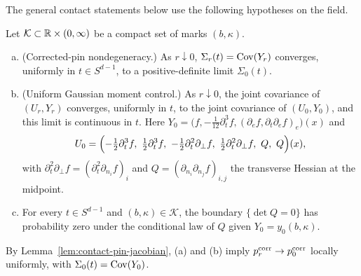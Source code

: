 The general contact statements below use the following hypotheses on the field.

\begin{hypothesis}\label{hyp:contact-regular}
Let $\mathcal K\subset\mathbb R\times(0,\infty)$ be a compact set of marks $(b,\kappa)$.
\begin{enumerate}[(a)]
\item (Corrected-pin nondegeneracy.) As $r\downarrow0$, $\Sigma_r(t)=\operatorname{Cov}(Y_r)$ converges, uniformly in $t\in S^{d-1}$, to a positive-definite limit $\Sigma_0(t)$.
\item (Uniform Gaussian moment control.) As $r\downarrow0$, the joint covariance of $(U_r,Y_r)$ converges, uniformly in $t$, to the joint covariance of $(U_0,Y_0)$, and this limit is continuous in $t$. Here $Y_0=\bigl(f,-\frac1{12}\partial_t^3f,(\partial_ef,\partial_t\partial_ef)_{e}\bigr)(x)$ and
\[
U_0=\Bigl(-\tfrac12\partial_t^3f,\ \tfrac12\partial_t^3f,\ -\tfrac12\partial_t^2\partial_\perp f,\ \tfrac12\partial_t^2\partial_\perp f,\ Q,\ Q\Bigr)(x),
\]
with $\partial_t^2\partial_\perp f=(\partial_t^2\partial_{n_i}f)_i$ and $Q=(\partial_{n_i}\partial_{n_j}f)_{i,j}$ the transverse Hessian at the midpoint.
\item For every $t\in S^{d-1}$ and $(b,\kappa)\in\mathcal K$, the boundary $\{\det Q=0\}$ has probability zero under the conditional law of $Q$ given $Y_0=y_0(b,\kappa)$.
\end{enumerate}
\end{hypothesis}

By Lemma~\ref{lem:contact-pin-jacobian}, (a) and (b) imply $p^{\rm corr}_r\to p^{\rm corr}_0$ locally uniformly, with $\Sigma_0(t)=\operatorname{Cov}(Y_0)$.

